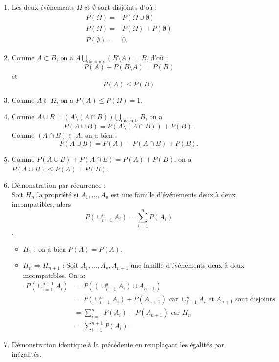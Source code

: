 \documentclass{book}
\begin{document}
\begin{Demonstration}
\begin{enumerate}
\item Les deux événements  $\Omega$ et $\emptyset$ sont disjoints d'où :
$$\begin{aligned}
P(\Omega)=&P(\Omega\cup \emptyset )\\
P(\Omega)=&P(\Omega)+P(\emptyset)\\
P(\emptyset)=&0.
\end{aligned}$$
\item Comme $A\subset B$, on a  $A \bigcup\limits_{\text{disjoints}}(B\setminus A)=B$, d'où :
$$ P(A)+P(B\setminus A)=P(B)$$
et 
$$ P(A)\leq P(B)$$
\item Comme $A\subset \Omega$, on a $P(A)\leq P(\Omega)=1$.
\item Comme $A\cup B=(A\setminus (A\cap B))\bigcup\limits_{\text{disjoints}}B$, on a $$P(A\cup B)=P(A\setminus (A\cap B))+P(B).$$ Comme $(A\cap B)\subset A$, on a bien : 
 $$P(A\cup B)=P(A)- P(A\cap B)+P(B).$$
\item Comme $P(A\cup B)+ P(A\cap B)=P(A)+P(B)$, on a $P(A\cup B)\leq P(A)+P(B)$.
\item Démonstration par récurrence :\\
Soit $H_n$ la propriété si $A_1, \dots, A_n$ est une famille d'événements deux à deux incompatibles,
alors \[ P\left( \cup_{i=1}^n A_i \right) = \sum_{i=1}^n P(A_i) \].
\begin{itemize}
\item $H_1$ : on a bien  $P(A)=P(A)$.
\item $H_n\Rightarrow H_{n+1}$ : Soit $A_1, \dots, A_n, A_{n+1}$ une famille d'événements deux à deux incompatibles. On a:
$$\begin{aligned}
P\left( \cup_{i=1}^{n+1} A_i \right)&=P(\left( \cup_{i=1}^{n} A_i \right)\cup A_{n+1} )\\
&=P\left( \cup_{i=1}^{n} A_i \right)+ P (A_{n+1} ) \text{ car } \cup_{i=1}^{n} A_i \text{ et } A_{n+1} \text{ sont disjoints} \\
&= \sum_{i=1}^n P(A_i)+ P (A_{n+1} ) \text{ car } H_n \\
&= \sum_{i=1}^{n+1} P(A_i).
\end{aligned}$$
\end{itemize}
\item Démonstration identique à la précédente en remplaçant les égalités par inégalités.
\end{enumerate}
\end{Demonstration}
\end{document}
